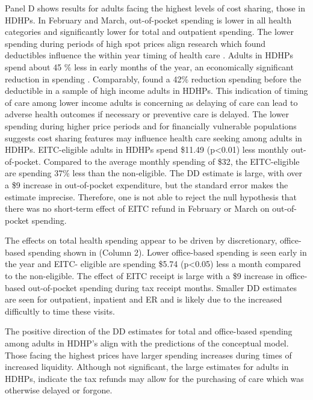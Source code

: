 \documentclass[smallcondensed,referee]{svjour3}
\begin{document}
Panel D shows results for adults facing the highest levels of cost sharing, those in HDHPs. In February and March, out-of-pocket spending is lower in all health categories and significantly lower for total and outpatient spending. The lower spending during periods of high spot prices align research which found deductibles influence the within year timing of health care \citep{gerfin_healthcare_2015, lin_intertemporal_2019, cabral_claim_2017, brot-goldberg_what_2017}.  Adults in HDHPs spend about 45 \% less in early months of the year, an economically significant reduction in spending . 
Comparably, \citep{brot-goldberg_what_2017} found a 42\% reduction spending before the deductible in a sample of high income adults in HDHPs. This indication of timing of care among lower income adults is concerning as delaying of care can lead to adverse health outcomes if necessary or preventive care is delayed.
 The lower spending during higher price periods and for financially vulnerable populations suggests cost sharing features may influence health care seeking among adults in HDHPs. EITC-eligible adults in HDHPs spend \$11.49 (p<0.01) less monthly out-of-pocket. Compared to the average monthly spending of \$32, the EITC-eligible are spending 37\% less than the non-eligible. The DD estimate is large, with over a \$9 increase in out-of-pocket expenditure,  but the standard error makes the estimate imprecise. Therefore, one is not able to reject the null hypothesis that there was no short-term effect of EITC refund in February or March on out-of-pocket spending. 

The effects on total health spending appear to be driven by discretionary, office-based spending shown in (Column 2). Lower office-based spending is seen early in the year and EITC- eligible are spending \$5.74 (p<0.05) less a month compared to the non-eligible. The effect of EITC receipt is large with a \$9 increase in office-based out-of-pocket spending during tax receipt months. Smaller DD estimates are seen for outpatient, inpatient and ER and is likely due to the increased difficultly to time these visits. 
  
  The positive direction of the DD estimates for total and office-based spending among adults in HDHP's align with the predictions of the conceptual model. Those facing the highest prices have larger spending increases during times of increased liquidity. Although not significant, the large estimates for adults in HDHPs, indicate the tax refunds may allow for the purchasing of care which was otherwise delayed or forgone.
\end{document}
